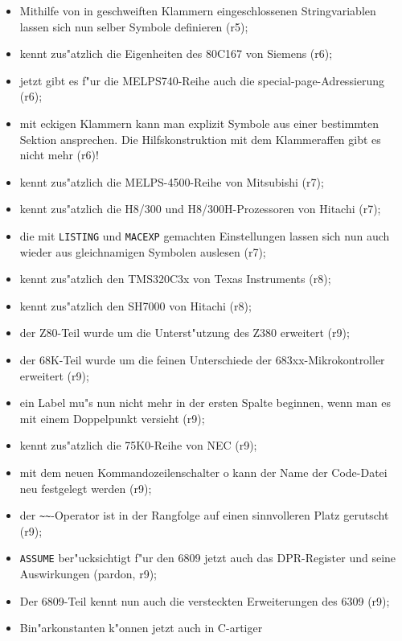 \documentclass[12pt,a4paper,twoside]{report}
\newcommand{\tty}[1]{{\tt #1}}
\begin{document}
{\begin{itemize}
{\begin{itemize}
{            zu k"onnen (r5);}
      \item{Mithilfe von in geschweiften Klammern eingeschlossenen
            Stringvariablen lassen sich nun selber Symbole definieren
            (r5);}
      \item{kennt zus"atzlich die Eigenheiten des 80C167 von Siemens (r6);}
      \item{jetzt gibt es f"ur die MELPS740-Reihe auch die
            special-page-Adressierung (r6);}
      \item{mit eckigen Klammern kann man explizit Symbole aus einer
            bestimmten Sektion ansprechen.  Die Hilfskonstruktion mit dem
            Klammeraffen gibt es nicht mehr (r6)!}
      \item{kennt zus"atzlich die MELPS-4500-Reihe von Mitsubishi (r7);}
      \item{kennt zus"atzlich die H8/300 und H8/300H-Prozessoren von
            Hitachi (r7);}
      \item{die mit \tty{LISTING} und \tty{MACEXP} gemachten Einstellungen
            lassen sich nun auch wieder aus gleichnamigen Symbolen auslesen
            (r7);}
      \item{kennt zus"atzlich den TMS320C3x von Texas Instruments (r8);}
      \item{kennt zus"atzlich den SH7000 von Hitachi (r8);}
      \item{der Z80-Teil wurde um die Unterst"utzung des Z380 erweitert (r9);}
      \item{der 68K-Teil wurde um die feinen Unterschiede der
            683xx-Mikrokontroller erweitert (r9);}
      \item{ein Label mu"s nun nicht mehr in der ersten Spalte beginnen,
            wenn man es mit einem Doppelpunkt versieht (r9);}
      \item{kennt zus"atzlich die 75K0-Reihe von NEC (r9);}
      \item{mit dem neuen Kommandozeilenschalter o kann der Name
            der Code-Datei neu festgelegt werden (r9);}
      \item{der \verb!~~!-Operator ist in der Rangfolge auf einen
            sinnvolleren Platz gerutscht (r9);}
      \item{\tty{ASSUME} ber"ucksichtigt f"ur den 6809 jetzt auch das
            DPR-Register und seine Auswirkungen (pardon, r9);}
      \item{Der 6809-Teil kennt nun auch die versteckten
            Erweiterungen des 6309 (r9);}
      \item{Bin"arkonstanten k"onnen jetzt auch in C-artiger
}
\end{itemize}}
\end{itemize}}
\end{document}
